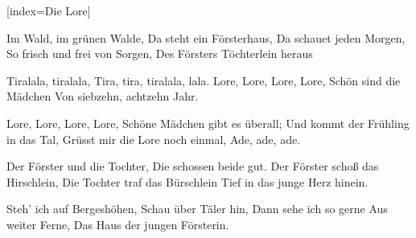 [index={Die Lore}]

\beginverse
Im Wald, im gr\"unen Walde,
Da steht ein F\"orsterhaus,
Da schauet jeden Morgen,
So frisch und frei von Sorgen,
Des F\"orsters Töchterlein heraus
\endverse

\beginchorus
Tiralala, tiralala,
Tira, tira, tiralala, lala.
Lore, Lore, Lore, Lore,
Sch\"on sind die M\"adchen
Von siebzehn, achtzehn Jahr.


Lore, Lore, Lore, Lore,
Sch\"one M\"adchen gibt es \"uberall;
Und kommt der Fr\"uhling in das Tal,
Gr\"usst mir die Lore noch einmal,
Ade, ade, ade.
\endchorus

\beginverse
Der F\"orster und die Tochter,
Die schossen beide gut.
Der F\"orster scho\ss{} das Hirschlein,
Die Tochter traf das B\"urschlein
Tief in das junge Herz hinein.
\endverse

\beginverse
Steh' ich auf Bergesh\"ohen,
Schau \"uber T\"aler hin,
Dann sehe ich so gerne
Aus weiter Ferne,
Das Haus der jungen Försterin.
\endverse

\endsong